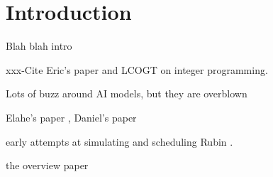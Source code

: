 \documentclass[]{aastex631}
\begin{document}


\section{Introduction} \label{sec:intro}
Blah blah intro

xxx-Cite Eric's paper and LCOGT on integer programming.

Lots of buzz around AI models, but they are overblown \citep{Hicks24}


Elahe's paper \citet{Naghib2019}, Daniel's paper \citep{Rothchild2019}



early attempts at simulating and scheduling Rubin \citet{Delgado2014, Delgado2016SPIE}.

the overview paper \citet{Rubin_overview2019}
\end{document}
